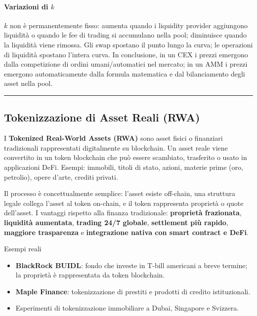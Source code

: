 \documentclass[
  italian,
  openany]{book}
\providecommand{\tightlist}{%
  \setlength{\itemsep}{0pt}\setlength{\parskip}{0pt}}
\begin{document}
\paragraph{\texorpdfstring{Variazioni di
\(k\)}{Variazioni di k}}\label{variazioni-di-k}

\(k\) non è permanentemente fisso: aumenta quando i liquidity provider
aggiungono liquidità o quando le fee di trading si accumulano nella
pool; diminuisce quando la liquidità viene rimossa. Gli swap spostano il
punto lungo la curva; le operazioni di liquidità spostano l'intera
curva. In conclusione, in un CEX i prezzi emergono dalla competizione di
ordini umani/automatici nel mercato; in un AMM i prezzi emergono
automaticamente dalla formula matematica e dal bilanciamento degli asset
nella pool.

\begin{center}\rule{0.5\linewidth}{0.5pt}\end{center}

\subsection{Tokenizzazione di Asset Reali
(RWA)}\label{tokenizzazione-di-asset-reali-rwa}

I \textbf{Tokenized Real-World Assets (RWA)} sono asset fisici o
finanziari tradizionali rappresentati digitalmente su blockchain. Un
asset reale viene convertito in un token blockchain che può essere
scambiato, trasferito o usato in applicazioni DeFi. Esempi: immobili,
titoli di stato, azioni, materie prime (oro, petrolio), opere d'arte,
crediti privati.

Il processo è concettualmente semplice: l'asset esiste off-chain, una
struttura legale collega l'asset al token on-chain, e il token
rappresenta proprietà o quote dell'asset. I vantaggi rispetto alla
finanza tradizionale: \textbf{proprietà frazionata}, \textbf{liquidità
aumentata}, \textbf{trading 24/7 globale}, \textbf{settlement più
rapido}, \textbf{maggiore trasparenza} e \textbf{integrazione nativa con
smart contract e DeFi}.

\begin{callouttip}{Esempi reali}

\begin{itemize}
\tightlist
\item
  \textbf{BlackRock BUIDL}: fondo che investe in T-bill americani a
  breve termine; la proprietà è rappresentata da token blockchain.
\item
  \textbf{Maple Finance}: tokenizzazione di prestiti e prodotti di
  credito istituzionali.
\item
  Esperimenti di tokenizzazione immobiliare a Dubai, Singapore e
  Svizzera.
\end{itemize}

\end{callouttip}
\end{document}

